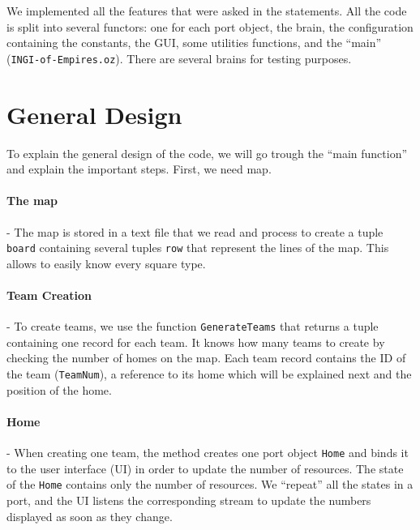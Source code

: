 

We implemented all the features that were asked in the statements. All the code is split into several functors: one for each port object, the brain, the configuration containing the constants, the GUI, some utilities functions, and the \textquotedblleft{}main\textquotedblright{} (\texttt{INGI-of-Empires.oz}). There are several brains for testing purposes.

\section{General Design}
To explain the general design of the code, we will go trough the \textquotedblleft{}main function\textquotedblright{} and explain the important steps. First, we need map.

\paragraph{The map}
- The map is stored in a text file that we read and process to create a tuple \texttt{board} containing several tuples \texttt{row} that represent the lines of the map. This allows to easily know every square type.

\paragraph{Team Creation}
- To create teams, we use the function \texttt{GenerateTeams} that returns a tuple containing one record for each team. It knows how many teams to create by checking the number of homes on the map.
Each team record contains the ID of the team (\texttt{TeamNum}), a reference to its home which will be explained next and the position of the home.

\paragraph{Home}
- When creating one team, the method creates one port object \texttt{Home} and binds it to the user interface (UI) in order to update the number of resources. The state of the \texttt{Home} contains only the number of resources. We \textquotedblleft{}repeat\textquotedblright{} all the states in a port, and the UI listens the corresponding stream to update the numbers displayed as soon as they change.

